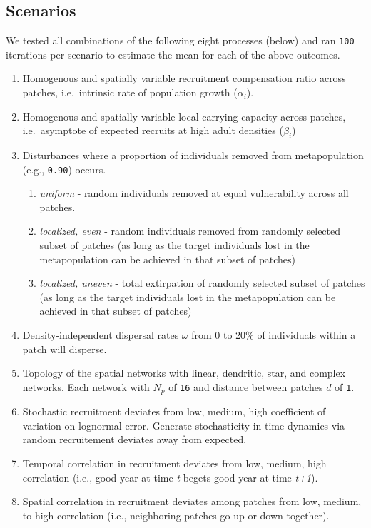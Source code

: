 \documentclass[
]{article}
\providecommand{\tightlist}{%
  \setlength{\itemsep}{0pt}\setlength{\parskip}{0pt}}
\begin{document}
\hypertarget{scenarios}{%
\subsection{Scenarios}\label{scenarios}}

We tested all combinations of the following eight processes (below) and
ran \texttt{100} iterations per scenario to estimate the mean for each
of the above outcomes.

\begin{enumerate}
\def\labelenumi{\arabic{enumi}.}
\item
  Homogenous and spatially variable recruitment compensation ratio
  across patches, i.e.~intrinsic rate of population growth
  (\(\alpha_i\)).
\item
  Homogenous and spatially variable local carrying capacity across
  patches, i.e.~asymptote of expected recruits at high adult densities
  (\(\beta_i\))
\item
  Disturbances where a proportion of individuals removed from
  metapopulation (e.g., \texttt{0.90}) occurs.

  \begin{enumerate}
  \def\labelenumii{\alph{enumii}.}
  \tightlist
  \item
    \emph{uniform} - random individuals removed at equal vulnerability
    across all patches.
  \item
    \emph{localized, even} - random individuals removed from randomly
    selected subset of patches (as long as the target individuals lost
    in the metapopulation can be achieved in that subset of patches)
  \item
    \emph{localized, uneven} - total extirpation of randomly selected
    subset of patches (as long as the target individuals lost in the
    metapopulation can be achieved in that subset of patches)
  \end{enumerate}
\item
  Density-independent dispersal rates \(\omega\) from 0 to 20\% of
  individuals within a patch will disperse.
\item
  Topology of the spatial networks with linear, dendritic, star, and
  complex networks. Each network with \(N_p\) of \texttt{16} and
  distance between patches \(\bar{d}\) of \texttt{1}.
\item
  Stochastic recruitment deviates from low, medium, high coefficient of
  variation on lognormal error. Generate stochasticity in time-dynamics
  via random recruitement deviates away from expected.
\item
  Temporal correlation in recruitment deviates from low, medium, high
  correlation (i.e., good year at time \emph{t} begets good year at time
  \emph{t+1}).
\item
  Spatial correlation in recruitment deviates among patches from low,
  medium, to high correlation (i.e., neighboring patches go up or down
  together).
\end{enumerate}
\end{document}
